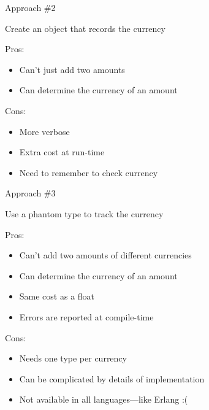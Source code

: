 \documentclass[11pt]{beamer}
\renewcommand\big[1]{
  \begin{center}
    \Large{#1}
  \end{center}
}
\begin{document}
\begin{frame}
  \big{Approach \#2}
  \centering Create an object that records the currency
  \pause
  \vskip1cm
  \begin{minipage}[t]{.48\textwidth}
    Pros:
    \footnotesize
    \begin{itemize}
      \item Can't just add two amounts
      \item Can determine the currency of an amount
    \end{itemize}
  \end{minipage}
  \begin{minipage}[t]{.48\textwidth}
    Cons:
    \footnotesize
    \begin{itemize}
      \item More verbose
      \item Extra cost at run-time
      \item Need to remember to check currency
    \end{itemize}
  \end{minipage}
\end{frame}

\begin{frame}
  \big{Approach \#3}
  \centering Use a phantom type to track the currency
  \pause
  \vskip1cm
  \begin{minipage}[t]{.48\textwidth}
    Pros:
    \footnotesize
    \begin{itemize}
      \item Can't add two amounts of different currencies
      \item Can determine the currency of an amount
      \item Same cost as a float
      \item Errors are reported at compile-time
    \end{itemize}
  \end{minipage}
  \begin{minipage}[t]{.48\textwidth}
    Cons:
    \footnotesize
    \begin{itemize}
      \item Needs one type per currency
      \item Can be complicated by details of implementation
      \item Not available in all languages---like Erlang :(
    \end{itemize}
  \end{minipage}
\end{frame}
\end{document}

